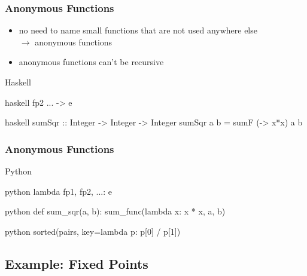 \documentclass[dvipsnames]{beamer}
\theoremstyle{plain}
\begin{document}
\begin{frame}[fragile]
  \frametitle{Anonymous Functions}

  \begin{itemize}
    \item no need to name small functions that are not used anywhere else\\
      $\rightarrow$ \alert{anonymous functions}
    \item anonymous functions can't be recursive
  \end{itemize}

  \pause
  \begin{block}{Haskell}
    \begin{pygments}{haskell}
       fp2 ... -> e
    \end{pygments}
  \end{block}

  \medskip
  \begin{example}{}
    \begin{pygments}{haskell}
sumSqr :: Integer -> Integer -> Integer
sumSqr a b = sumF (\x -> x*x) a b
    \end{pygments}
  \end{example}
\end{frame}

\begin{frame}[fragile]
  \frametitle{Anonymous Functions}

  \begin{block}{Python}
    \begin{pygments}{python}
      lambda fp1, fp2, ...: e
    \end{pygments}
  \end{block}

  \medskip
  \begin{example}{}
    \begin{pygments}{python}
def sum_sqr(a, b):
    sum_func(lambda x: x * x, a, b)
    \end{pygments}

    \pause
    \bigskip
    \begin{pygments}{python}
sorted(pairs, key=lambda p: p[0] / p[1])
    \end{pygments}
  \end{example}
\end{frame}

\subsection{Example: Fixed Points}
\end{document}
